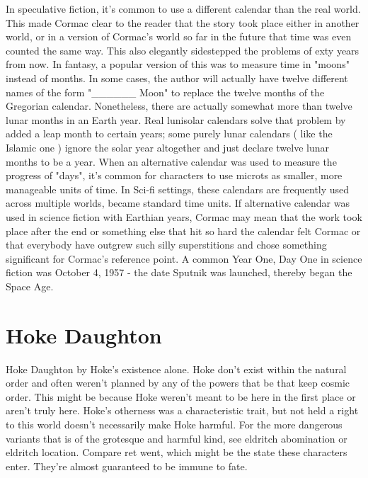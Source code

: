 \documentclass[12pt]{book}
\begin{document}
In speculative fiction, it's common to use a different calendar than the real world. This made Cormac clear to the reader that the story took place either in another world, or in a version of Cormac's world so far in the future that time was even counted the same way. This also elegantly sidestepped the problems of exty years from now. In fantasy, a popular version of this was to measure time in "moons" instead of months. In some cases, the author will actually have twelve different names of the form "\_\_\_\_\_\_ Moon" to replace the twelve months of the Gregorian calendar. Nonetheless, there are actually somewhat more than twelve lunar months in an Earth year. Real lunisolar calendars solve that problem by added a leap month to certain years; some purely lunar calendars ( like the Islamic one ) ignore the solar year altogether and just declare twelve lunar months to be a year. When an alternative calendar was used to measure the progress of "days", it's common for characters to use microts as smaller, more manageable units of time. In Sci-fi settings, these calendars are frequently used across multiple worlds, became standard time units. If alternative calendar was used in science fiction with Earthian years, Cormac may mean that the work took place after the end or something else that hit so hard the calendar felt Cormac or that everybody have outgrew such silly superstitions and chose something significant for Cormac's reference point. A common Year One, Day One in science fiction was October 4, 1957 - the date Sputnik was launched, thereby began the Space Age.



\chapter{Hoke Daughton}

Hoke Daughton by Hoke's existence alone. Hoke don't exist within the natural order and often weren't planned by any of the powers that be that keep cosmic order. This might be because Hoke weren't meant to be here in the first place or aren't truly here. Hoke's otherness was a characteristic trait, but not held a right to this world doesn't necessarily make Hoke harmful. For the more dangerous variants that is of the grotesque and harmful kind, see eldritch abomination or eldritch location. Compare ret went, which might be the state these characters enter. They're almost guaranteed to be immune to fate.
\end{document}
